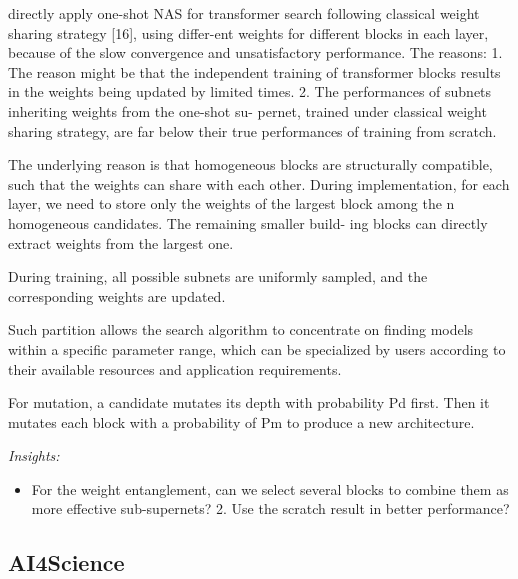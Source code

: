 \documentclass[8pt,UTF8]{article}
\begin{document}
            directly apply one-shot NAS for transformer search following classical weight sharing strategy [16], using differ-ent weights for different blocks in each layer, because of the slow convergence and unsatisfactory performance. The reasons: 1. The reason might be that the independent training of transformer blocks results in the weights being updated by limited times. 2. The performances of subnets inheriting weights from the one-shot su- pernet, trained under classical weight sharing strategy, are far below their true performances of training from scratch. 
            
            The underlying reason is that homogeneous blocks are structurally compatible, such that the weights can share with each other. During implementation, for each layer, we need to store only the weights of the largest block among the n homogeneous candidates. The remaining smaller build- ing blocks can directly extract weights from the largest one.
            
            During training, all possible subnets are uniformly sampled, and the corresponding weights are updated.
            
            Such partition allows the search algorithm to concentrate on finding models within a specific parameter range, which can be specialized by users according to their available resources and application requirements.
            
            For mutation, a candidate mutates its depth with probability Pd first. Then it mutates each block with a probability of Pm to produce a new architecture.
            
            \emph{Insights:} 
            \begin{itemize}
                \item For the weight entanglement, can we select several blocks to combine them as more effective sub-supernets?  2. Use the scratch result in better performance?
            \end{itemize}
        
    \subsection{AI4Science}
\end{document}
